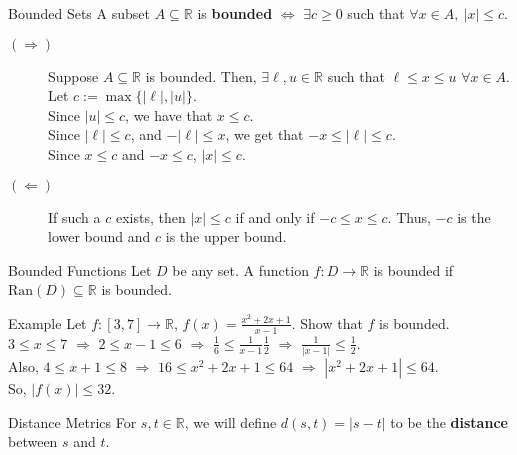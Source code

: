 \documentclass[8pt]{extarticle}
\newcommand{\ran}{\text{Ran}}
\newcommand{\R}{\mathbb{R}}
\begin{document}
  \begin{problem}{Bounded Sets}
    A subset $A\subseteq \R$ is \textbf{bounded} $\Leftrightarrow$  $\exists c \geq 0$ such that $\forall x\in A,~|x| \leq c$.
    \begin{description}
      \item[$(\Rightarrow)$] Suppose $A\subseteq \R$ is bounded. Then, $\exists \ell,u\in \R$ such that $\ell\leq x\leq u$ $\forall x\in A$. Let $c := \max\{|\ell|,|u|\}$.\\

        Since $|u| \leq c$, we have that $x\leq c$.\\

        Since $|\ell| \leq c$, and $-|\ell| \leq x$, we get that $-x \leq |\ell| \leq c$.\\

        Since $x\leq c$ and $-x\leq c$, $|x| \leq c$.
      \item[$(\Leftarrow)$] If such a $c$ exists, then $|x| \leq c$ if and only if $-c \leq x \leq c$. Thus, $-c$ is the lower bound and $c$ is the upper bound.
    \end{description}
    \begin{problem}{Bounded Functions}
      Let $D$ be any set. A function $f: D\rightarrow \R$ is bounded if $\ran(D)\subseteq \R$ is bounded.
    \end{problem}
    \begin{problem}{Example}
      Let $f: [3,7] \rightarrow \R$, $f(x) = \frac{x^2 + 2x + 1}{x-1}$. Show that $f$ is bounded.
      \tcblower
      $3\leq x \leq 7$ $\Rightarrow$ $2 \leq x-1 \leq 6$ $\Rightarrow$ $\frac{1}{6} \leq \frac{1}{x-1} \frac{1}{2}$ $\Rightarrow$ $\frac{1}{|x-1|} \leq \frac{1}{2}$.\\

      Also, $4 \leq x+1 \leq 8$ $\Rightarrow$ $16 \leq x^2 + 2x + 1 \leq 64$ $\Rightarrow$ $|x^2 + 2x + 1| \leq 64$.\\

      So, $|f(x)| \leq 32$.
    \end{problem}
    \begin{problem}{Distance Metrics}
      For $s,t\in\R$, we will define $d(s,t) = |s-t|$ to be the \textbf{distance} between $s$ and $t$.


\end{problem}
\end{problem}
\end{document}
